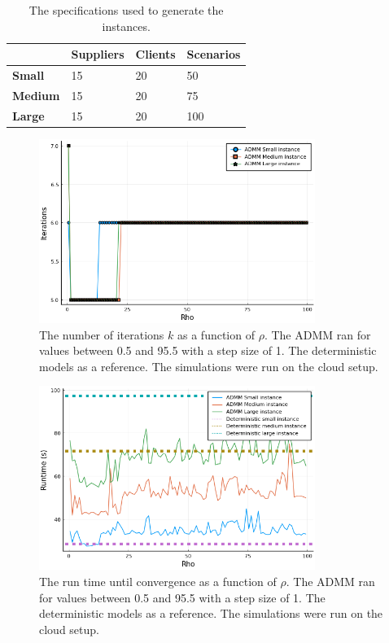 \documentclass[a4paper]{artikel3}
\begin{document}
\begin{table}[h]
    \centering
    \caption{The specifications used to generate the instances.}
    \label{tab:instance_specs}
        \begin{tabular}{l|l|l|l|}
        \cline{2-4}
                                              & \textbf{Suppliers} & \textbf{Clients} & \textbf{Scenarios} \\ \hline
        \multicolumn{1}{|l|}{\textbf{Small}}  & 15                 & 20               & 50                 \\ \hline
        \multicolumn{1}{|l|}{\textbf{Medium}} & 15                 & 20               & 75                 \\ \hline
        \multicolumn{1}{|l|}{\textbf{Large}}  & 15                 & 20               & 100                \\ \hline
    \end{tabular}
\end{table}

\begin{figure}[H]
\centering
\includegraphics[width=0.80\textwidth]{iterations_cloud.png}
\caption{The number of iterations $k$ as a function of $\rho$. The ADMM ran for values between 0.5 and 95.5 with a step size of 1. The deterministic models as a reference. The simulations were run on the cloud setup.}
\label{fig:iterations_cloud}
\end{figure}

\begin{figure}[H]
\centering
\includegraphics[width=0.80\textwidth]{times_cloud.png}
\caption{The run time until convergence  as a function of $\rho$. The ADMM ran for values between 0.5 and 95.5 with a step size of 1. The deterministic models as a reference. The simulations were run on the cloud setup.}
\label{fig:times_cloud}
\end{figure}
\end{document}
